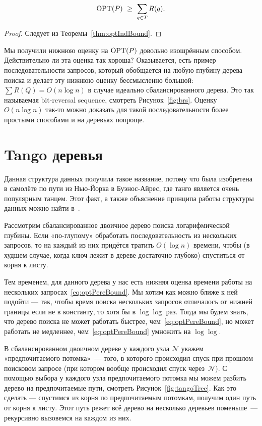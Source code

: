 \begin{theorem} \label{thm:optPereBound}
\begin{equation} \label{eq:optPereBound}
	\operatorname{OPT}(P)\ \ge\ \sum\limits_{q \in T} R(q).
\end{equation}
\end{theorem}

\begin{proof}
Следует из Теоремы~\ref{thm:optIndBound}.
\end{proof}

Мы получили нижнюю оценку на $\operatorname{OPT}(P)$ довольно изощрённым способом. Действительно ли эта оценка так хороша? Оказывается, есть пример последовательности запросов, который обобщается на любую глубину дерева поиска и делает эту нижнюю оценку бессмысленно большой: $\sum R(Q) = O(n \log n)$ в случае идеально сбалансированного дерева. Это так называемая bit-reversal sequence, смотреть Рисунок~\ref{fig:brs}. Оценку $O(n \log n)$ так-то можно доказать для такой последовательности более простыми способами и на деревьях попроще.



\section{Tango деревья} 

Данная структура данных получила такое название, потому что была изобретена
в самолёте по пути из Нью-Йорка в Буэнос-Айрес, где танго является
очень популярным танцем. Этот факт, а также объяснение принципа работы
структуры данных можно найти в~\cite{demaineTangoVideo}.

Рассмотрим сбалансированное двоичное дерево поиска логарифмической глубины. Если «по-глупому» обработать последовательность из нескольких запросов, то на каждый из них придётся тратить $O (\log n)$ времени, чтобы (в худшем случае, когда ключ лежит в дереве достаточно глубоко) спуститься от корня к листу.

Тем временем, для данного дерева у нас есть нижняя оценка времени работы на нескольких запросах~\eqref{eq:optPereBound}. Мы хотим как можно ближе к ней подойти — так, чтобы время поиска нескольких запросов отличалось от нижней границы если не в константу, то хотя бы в $\log \log$ раз. Тогда мы будем знать, что дерево поиска не может работать быстрее, чем~\eqref{eq:optPereBound}, но может работать не медленнее, чем~\eqref{eq:optPereBound} умножить на $\log \log$.

В сбалансированном двоичном дереве у каждого узла $\mathcal N$ укажем «предпочитаемого потомка»~— того, в которого происходил спуск при прошлом поисковом запросе (при котором вообще происходил спуск через~$\mathcal N$). С помощью выбора у каждого узла предпочитаемого потомка мы можем разбить дерево на предпочитаемые пути, смотреть Рисунок~\ref{fig:tangoTree}. Как это сделать — спустимся из корня по предпочитаемым потомкам, получим один путь от корня к листу. Этот путь режет всё дерево на несколько деревьев поменьше~— рекурсивно вызовемся на каждом из них. 

